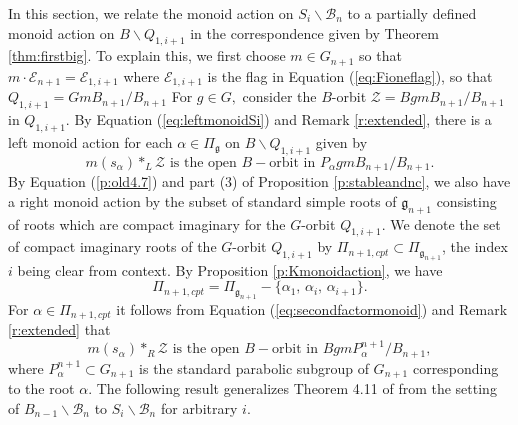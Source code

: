 \documentclass[12pt]{amsart}
\numberwithin{equation}{section}
\newcommand{\cZ}{{\mathcal Z}}
\newcommand{\fg}{\mbox{${\mathfrak g}$}}
\newcommand{\B}{\mathcal{B}}
\newcommand{\ms}{m(s_{\alpha})}
\newcommand{\BQ}{B\backslash Q_{1,i+1}}
\begin{document}
In this section, we relate the monoid action on $S_{i}\backslash\B_{n}$ to a partially defined monoid action on $B\backslash Q_{1,i+1}$ in the correspondence given by Theorem \ref{thm:firstbig}.
To explain this, we first choose $m\in G_{n+1}$ so that $m\cdot\mathcal{E}_{n+1}=\mathcal{E}_{1,i+1}$ where $\mathcal{E}_{1,i+1}$ is the flag in Equation (\ref{eq:Fioneflag}), so that $Q_{1,i+1}=G m B_{n+1}/B_{n+1}$  For $g\in G,$ consider the $B$-orbit $\cZ=Bgm B_{n+1}/B_{n+1}$  in $Q_{1,i+1}$.  By Equation (\ref{eq:leftmonoidSi}) and Remark \ref{r:extended}, there is a left monoid action for each $\alpha \in \Pi_{\fg}$ on $\BQ$ given by 
 \begin{equation}\label{eq:BQleftmonoid}
 \ms*_{L} \cZ\mbox{ is the open } B-\mbox{orbit in } P_{\alpha}gm B_{n+1}/B_{n+1}.
 \end{equation}
 By Equation (\ref{p:old4.7}) and part (3) of Proposition \ref{p:stableandnc}, we also have a right monoid action by the subset of standard simple roots of $\fg_{n+1}$ consisting of roots which are compact imaginary for the $G$-orbit $Q_{1,i+1}$.  We denote the set of compact imaginary roots of the $G$-orbit $Q_{1,i+1}$ by $\Pi_{n+1, cpt}\subset\Pi_{\fg_{n+1}}$, the index $i$ being clear from context.  By Proposition \ref{p:Kmonoidaction}, we have 
 \begin{equation}\label{eq:compactroots}
  \Pi_{n+1, cpt}= \Pi_{\fg_{n+1}} - \{\alpha_{1},\,\alpha_{i},\, \alpha_{i+1} \}. 
 \end{equation}
For $\alpha\in \Pi_{n+1, cpt}$ it follows from Equation (\ref{eq:secondfactormonoid}) and Remark \ref{r:extended} that
 \begin{equation}\label{eq:BQrightmonoid}
 \ms*_{R} \cZ\mbox{ is the open } B-\mbox{orbit in } Bgm P_{\alpha}^{n+1}/B_{n+1},
 \end{equation}
 where $P_{\alpha}^{n+1}\subset G_{n+1}$ is the standard parabolic subgroup of $G_{n+1}$ corresponding to the root $\alpha$. %
 The following result generalizes Theorem 4.11 of \cite{CE21I} from the setting of $B_{n-1}\backslash\B_{n}$ to $S_{i}\backslash\B_{n}$ for arbitrary $i$.
\end{document}
